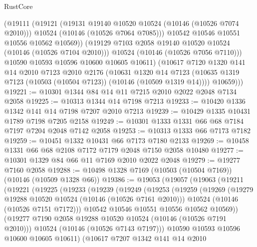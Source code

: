 \begin{lexlean}{RustCore}
\begin{coremodule}
              (@19111
                (@19121
                  (@19131 @19140 @10520 @10524 (@10146 (@10526 @7074 @2010)))
                  @10524
                  (@10146 (@10526 @7064 @7085)))
                @10542
                @10546
                @10551
                @10556
                @10562
                @10569))
            (@19129 @7103 @2058 @19140 @10520 @10524 (@10146 (@10526 @7104 @2010)))
            @10524
            (@10146 (@10526 @7056 @7110)))
          @10590
          @10593
          @10596
          @10600
          @10605
          @10611)
        (@10617
          @7120
          @1320
          @141
          @14
          @2010
          @7123
          @2010
          @2176
          (@10631
            @1320
            @14
            @7123
            (@10635 @1319 @7123 (@10503 (@10504 @7123)) (@10146 (@10509 @1319 @14))))
          @10659)))
@19221 := @10301 @1344 @84 @14 @11 @7215 @2010 @2022 @2048 @7134 @2058
@19225 := @10313 @1344 @14 @7198 @7213
@19233 := @10420 @1336 @1342 @141 @14 @7198 @7207 @2010 @7213
@19239 := @10429 @1335 @10431 @1789 @7198 @7205 @2158
@19249 := @10301 @1333 @1331 @66 @68 @7184 @7197 @7204 @2048 @7142 @2058
@19253 := @10313 @1333 @66 @7173 @7182
@19259 := @10451 @1332 @10431 @66 @7173 @7180 @2133
@19269 := @10458 @1331 @66 @68 @2108 @7172 @7179 @2048 @7150 @2058 @10480
@19277 := @10301 @1329 @84 @66 @11 @7169 @2010 @2022 @2048
@19279 := @19277 @7160 @2058
@19288 := @10498 @1328 @7169 (@10503 (@10504 @7169)) (@10146 (@10509 @1328 @66))
@19386 := @19053
    (@19057
      (@19063
        (@19211
          (@19221
            (@19225
              (@19233
                (@19239
                  (@19249
                    (@19253
                      (@19259
                        (@19269
                          (@19279 @19288 @10520 @10524 (@10146 (@10526 @7161 @2010)))
                          @10524
                          (@10146 (@10526 @7151 @7172)))
                        @10542
                        @10546
                        @10551
                        @10556
                        @10562
                        @10569))
                    (@19277 @7190 @2058 @19288 @10520 @10524 (@10146 (@10526 @7191 @2010)))
                    @10524
                    (@10146 (@10526 @7143 @7197)))
                  @10590
                  @10593
                  @10596
                  @10600
                  @10605
                  @10611)
                (@10617
                  @7207
                  @1342
                  @141
                  @14
                  @2010

\end{coremodule}
\end{lexlean}
